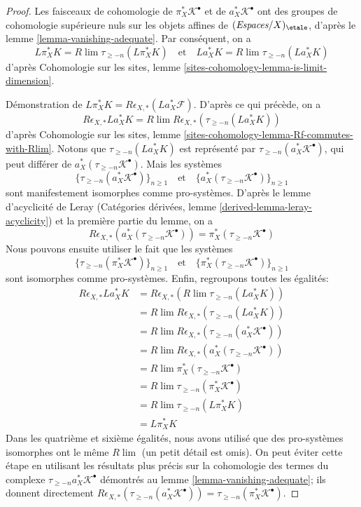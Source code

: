 \begin{proof}
\medskip\noindent
Les faisceaux de cohomologie de $\pi_X^*\mathcal{K}^\bullet$ et de
$a_X^*\mathcal{K}^\bullet$ ont des groupes de cohomologie supérieure nuls sur
les objets affines de $(\textit{Espaces}/X)_\etale$, d'après le lemme
\ref{lemma-vanishing-adequate}. Par conséquent, on a
$$
L\pi_X^*K = R\lim \tau_{\geq -n}(L\pi_X^*K)
\quad\text{et}\quad
La_X^*K = R\lim \tau_{\geq -n}(La_X^*K)
$$
d'après Cohomologie sur les sites, lemme
\ref{sites-cohomology-lemma-is-limit-dimension}.

\medskip\noindent
Démonstration de $L\pi_X^*K = R\epsilon_{X, *}(La_X^*\mathcal{F})$.
D'après ce qui précède, on a
$$
R\epsilon_{X, *}La_X^*K =
R\lim R\epsilon_{X, *}(\tau_{\geq -n}(La_X^*K))
$$
d'après Cohomologie sur les sites, lemme
\ref{sites-cohomology-lemma-Rf-commutes-with-Rlim}.
Notons que $\tau_{\geq -n}(La_X^*K)$ est représenté par
$\tau_{\geq -n}(a_X^*\mathcal{K}^\bullet)$, qui peut différer de
$a_X^*(\tau_{\geq -n}\mathcal{K}^\bullet)$.
Mais les systèmes
$$
\{\tau_{\geq -n}(a_X^*\mathcal{K}^\bullet)\}_{n \geq 1}
\quad\text{et}\quad
\{a_X^*(\tau_{\geq -n}\mathcal{K}^\bullet)\}_{n \geq 1}
$$
sont manifestement isomorphes comme pro-systèmes.
D'après le lemme d'acyclicité de Leray (Catégories dérivées, lemme
\ref{derived-lemma-leray-acyclicity}) et la première partie du lemme, on a
$$
R\epsilon_{X, *}(a_X^*(\tau_{\geq -n}\mathcal{K}^\bullet)) =
\pi_X^*(\tau_{\geq -n}\mathcal{K}^\bullet)
$$
Nous pouvons ensuite utiliser le fait que les systèmes
$$
\{\tau_{\geq -n}(\pi_X^*\mathcal{K}^\bullet)\}_{n \geq 1}
\quad\text{et}\quad
\{\pi_X^*(\tau_{\geq -n}\mathcal{K}^\bullet)\}_{n \geq 1}
$$
sont isomorphes comme pro-systèmes. Enfin, regroupons toutes les égalités:
\begin{align*}
R\epsilon_{X, *}La_X^*K
& =
R\epsilon_{X, *} (R\lim \tau_{\geq -n}(La_X^*K)) \\
& =
R\lim R\epsilon_{X, *}(\tau_{\geq -n}(La_X^*K)) \\
& =
R\lim R\epsilon_{X, *}(\tau_{\geq -n}(a_X^*\mathcal{K}^\bullet)) \\
& =
R\lim R\epsilon_{X, *}(a_X^*(\tau_{\geq -n}\mathcal{K}^\bullet)) \\
& =
R\lim \pi_X^*(\tau_{\geq -n}\mathcal{K}^\bullet) \\
& =
R\lim \tau_{\geq -n}(\pi_X^*\mathcal{K}^\bullet) \\
& =
R\lim \tau_{\geq -n}(L\pi_X^*K) \\
& =
L\pi_X^*K
\end{align*}
Dans les quatrième et sixième égalités, nous avons utilisé que des pro-systèmes
isomorphes ont le même $R\lim$ (un petit détail est omis).
On peut éviter cette étape en utilisant les résultats plus précis sur la
cohomologie des termes du complexe $\tau_{\geq -n}a_X^*\mathcal{K}^\bullet$
démontrés au lemme \ref{lemma-vanishing-adequate}; ils donnent directement
$R\epsilon_{X, *}(\tau_{\geq -n}(a_X^*\mathcal{K}^\bullet)) =
\tau_{\geq -n}(\pi_X^*\mathcal{K}^\bullet)$.


\end{proof}
